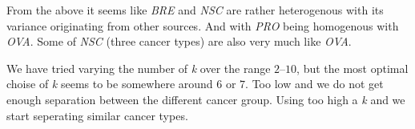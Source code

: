 From the above it seems like \emph{BRE} and \emph{NSC} are rather
heterogenous with its variance originating from other sources. And
with \emph{PRO} being homogenous with \emph{OVA}. Some of \emph{NSC}
(three cancer types) are also very much like \emph{OVA}.

We have tried varying the number of \emph{k} over the range $2$--$10$,
but the most optimal choise of \emph{k} seems to be somewhere around
$6$ or $7$. Too low and we do not get enough separation between the
different cancer group. Using too high a \emph{k} and we start
seperating similar cancer types.
